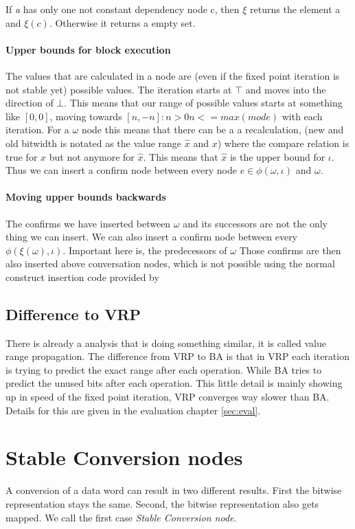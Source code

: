 If \textit{a} has only one not constant dependency node c, then $\xi$ returns the element a and $\xi(c)$. Otherwise it returns a empty set.

\paragraph{Upper bounds for block execution}
The values that are calculated in a node are (even if the fixed point iteration is not stable yet) possible values. The iteration starts at $\top$ and moves into the direction of $\bot$. This means that our range of possible values starts at something like $[0,0]$, moving towards $[n,-n]: n > 0 n <= max(mode)$ with each iteration. For a $\omega$ node this means that there can be a a recalculation, (new and old bitwidth is notated as the value range $\hat{x}$ and $x$) where the compare relation is true for $x$ but not anymore for  $\hat{x}$. This means that $\hat{x}$ is the upper bound for $\iota$. Thus we can insert a confirm node between every node $e \in \phi(\omega, \iota)$ and $\omega$.

\paragraph{Moving upper bounds backwards}
The confirms we have inserted between $\omega$ and its successors are not the only thing we can insert. We can also insert a confirm node between every $\phi(\xi(\omega), \iota)$. Important here is, the predecessors of $\omega$
Those confirms are then also inserted above conversation nodes, which is not possible using the normal construct insertion code provided by \libFIRM


\subsection{Difference to VRP}

There is already a analysis that is doing something similar, it is called value range propagation. The difference from VRP to BA is that in VRP each iteration is trying to predict the exact range after each operation. While BA tries to predict the unused bits after each operation. This little detail is mainly showing up in speed of the fixed point iteration, VRP converges way slower than BA. Details for this are given in the evaluation chapter \ref{sec:eval}.

\section{Stable Conversion nodes}
A conversion of a data word can result in two different results. First the bitwise representation stays the same. Second, the bitwise representation also gets mapped.
We call the first case \textit{Stable Conversion node}.


